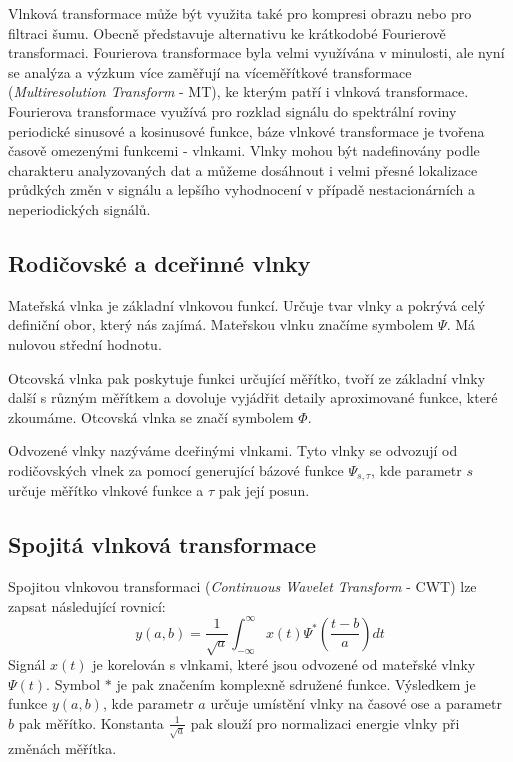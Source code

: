 Vlnková transformace může být využita také pro kompresi obrazu nebo pro filtraci šumu. \cite{WaveletHlavac} Obecně představuje alternativu ke krátkodobé Fourierově transformaci. Fourierova transformace byla velmi využívána v minulosti, ale nyní se analýza a výzkum více zaměřují na víceměřítkové transformace (\textit{Multiresolution Transform} - MT), ke kterým patří i vlnková transformace. Fourierova transformace využívá pro rozklad signálu do spektrální roviny periodické sinusové a kosinusové funkce, báze vlnkové transformace je tvořena časově omezenými funkcemi - vlnkami. Vlnky mohou být nadefinovány podle charakteru analyzovaných dat a můžeme dosáhnout i velmi přesné lokalizace průdkých změn v signálu a lepšího vyhodnocení v případě nestacionárních a neperiodických signálů. \cite{WaveletElektrorevue}

\subsection{Rodičovské a dceřinné vlnky}
Mateřská vlnka je základní vlnkovou funkcí. Určuje tvar vlnky a pokrývá celý definiční obor, který nás zajímá. Mateřskou vlnku značíme symbolem $\Psi$. Má nulovou střední hodnotu.

Otcovská vlnka pak poskytuje funkci určující měřítko, tvoří ze základní vlnky další s různým měřítkem a dovoluje vyjádřit detaily aproximované funkce, které zkoumáme. Otcovská vlnka se značí symbolem $\Phi$.

Odvozené vlnky nazýváme dceřinými vlnkami. Tyto vlnky se odvozují od rodičovských vlnek za pomocí generující bázové funkce $\Psi_{s,\tau}$, kde parametr $s$ určuje měřítko vlnkové funkce a $\tau$ pak její posun. \cite{WaveletHlavac}

\subsection{Spojitá vlnková transformace}
Spojitou vlnkovou transformaci (\textit{Continuous Wavelet Transform} - CWT) lze zapsat následující rovnicí: \cite{WaveletMathworks}
$$y(a,b) = \frac{1}{\sqrt{a}}\int_{-\infty}^{\infty} x(t)\Psi^*(\frac{t-b}{a}) dt$$
Signál $x(t)$ je korelován s vlnkami, které jsou odvozené od mateřské vlnky $\Psi(t)$. Symbol $*$ je pak značením komplexně sdružené funkce. Výsledkem je funkce $y(a,b)$, kde parametr $a$ určuje umístění vlnky na časové ose a parametr $b$ pak měřítko. Konstanta $\frac{1}{\sqrt{a}}$ pak slouží pro normalizaci energie vlnky při změnách měřítka.

